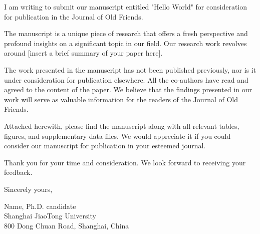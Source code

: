 \documentclass{article}
\begin{document}
I am writing to submit our manuscript entitled "Hello World" for consideration for publication in the Journal of Old Friends.

The manuscript is a unique piece of research that offers a fresh perspective and profound insights on a significant topic in our field. Our research work revolves around [insert a brief summary of your paper here].

The work presented in the manuscript has not been published previously, nor is it under consideration for publication elsewhere. All the co-authors have read and agreed to the content of the paper. We believe that the findings presented in our work will serve as valuable information for the readers of the Journal of Old Friends.

Attached herewith, please find the manuscript along with all relevant tables, figures, and supplementary data files. We would appreciate it if you could consider our manuscript for publication in your esteemed journal.

Thank you for your time and consideration. We look forward to receiving your feedback.

\bigskip %

Sincerely yours,

\vspace{20pt} %


Name, Ph.D. candidate \\
Shanghai JiaoTong University \\
800 Dong Chuan Road, Shanghai, China
\end{document}
